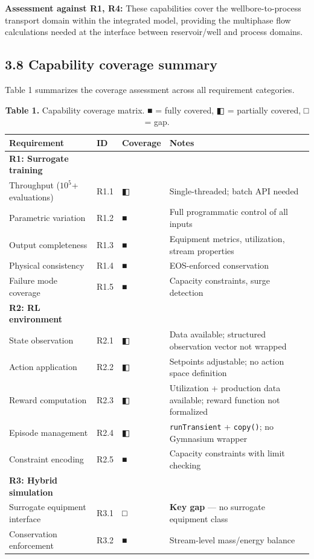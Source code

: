 \documentclass[review,3p]{custom}
\begin{document}
\textbf{Assessment against R1, R4:} These capabilities cover the wellbore-to-process transport domain within the integrated model, providing the multiphase flow calculations needed at the interface between reservoir/well and process domains.

\subsection{3.8 Capability coverage summary}

Table 1 summarizes the coverage assessment across all requirement categories.


\begin{table}[htbp]
\centering
\caption{\textbf{Table 1.} Capability coverage matrix. ■ = fully covered, ◧ = partially covered, □ = gap.}
\begin{tabular}{llll}
\toprule
Requirement & ID & Coverage & Notes \\
\midrule
\textbf{R1: Surrogate training} \\
Throughput ($10^5$+ evaluations) & R1.1 & ◧ & Single-threaded; batch API needed \\
Parametric variation & R1.2 & ■ & Full programmatic control of all inputs \\
Output completeness & R1.3 & ■ & Equipment metrics, utilization, stream properties \\
Physical consistency & R1.4 & ■ & EOS-enforced conservation \\
Failure mode coverage & R1.5 & ■ & Capacity constraints, surge detection \\
\textbf{R2: RL environment} \\
State observation & R2.1 & ◧ & Data available; structured observation vector not wrapped \\
Action application & R2.2 & ◧ & Setpoints adjustable; no action space definition \\
Reward computation & R2.3 & ◧ & Utilization + production data available; reward function not formalized \\
Episode management & R2.4 & ◧ & \texttt{runTransient} + \texttt{copy()}; no Gymnasium wrapper \\
Constraint encoding & R2.5 & ■ & Capacity constraints with limit checking \\
\textbf{R3: Hybrid simulation} \\
Surrogate equipment interface & R3.1 & □ & \textbf{Key gap} --- no surrogate equipment class \\
Conservation enforcement & R3.2 & ■ & Stream-level mass/energy balance \\

\end{tabular}
\end{table}
\end{document}
